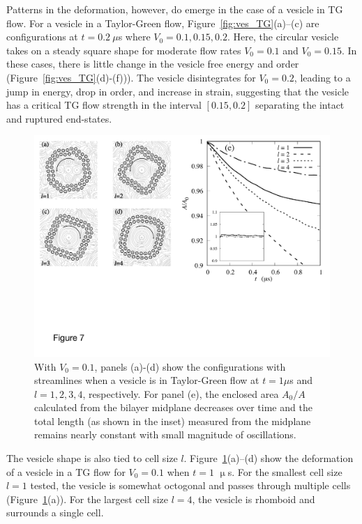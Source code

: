 \documentclass[aps,prl,preprint,groupedaddress]{revtex4-2}
\begin{document}
Patterns in the deformation, however, do emerge in the case of a vesicle in TG flow.
For a vesicle in a Taylor-Green flow, Figure~\ref{fig:ves_TG}(a)--(c) are configurations at $t=0.2\  \mu$s where $V_0=0.1,0.15,0.2$.
Here, the circular vesicle takes on a steady square shape for moderate flow rates $V_0 = 0.1$ and $V_0 = 0.15$.
In these cases, there is little change in the vesicle free energy and order (Figure~\ref{fig:ves_TG}(d)-(f))).
The vesicle disintegrates for $V_0 = 0.2$, leading to a jump in energy, drop in order, and increase in strain,
suggesting that the vesicle has a critical TG flow strength in the interval $[0.15, 0.2]$ separating the
intact and ruptured end-states.

\begin{figure}
  \begin{center}
\includegraphics[width=1.0\textwidth]{Figures/Figure7.pdf}
  \end{center}
  \vspace{-20pt}  
  \caption{\label{fig:BTG_Scale} With $V_0=0.1$, panels (a)-(d) show the configurations with streamlines when a vesicle is in Taylor-Green flow at $t=1 \mu$s and $l= 1,2,3,4$, respectively.
  For panel (e), the enclosed area $A_0/A$ calculated from the bilayer midplane decreases over time and the total length (as shown in the inset) measured from the midplane remains nearly constant with small magnitude of oscillations.
  }
\end{figure}

The vesicle shape is also tied to cell size $l$.  
Figure~\ref{fig:BTG_Scale}(a)--(d) show the deformation of a vesicle in a
TG flow for $V_0=0.1$ when $t = 1$ $\upmu$s.  
For the smallest cell size $l = 1$ tested, the vesicle is somewhat octogonal
and passes through multiple cells (Figure~\ref{fig:BTG_Scale}(a)).
For the largest cell size $l = 4$,
the vesicle is rhomboid and surrounds a single cell. 
\end{document}
